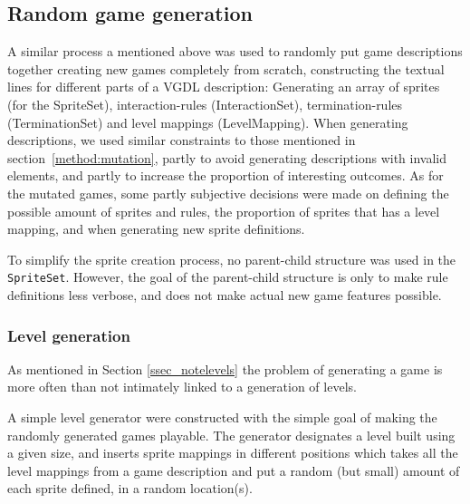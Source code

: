 \documentclass[a4paper,titlepage,final, twoside]{report}
\begin{document}
\subsection{Random game generation}
\label{method:random}
A similar process a mentioned above was used to randomly put game descriptions together creating new games completely from scratch, constructing the textual lines for different parts of a VGDL description: Generating an array of sprites (for the SpriteSet), interaction-rules (InteractionSet), termination-rules (TerminationSet) and level mappings (LevelMapping). 
When generating descriptions, we used similar constraints to those mentioned in section~\ref{method:mutation}, partly to avoid generating descriptions with invalid elements, and partly to increase the proportion of interesting outcomes. 
As for the mutated games, some partly subjective decisions were made on defining the possible amount of sprites and rules, the proportion of sprites that has a level mapping, and when generating new sprite definitions.

To simplify the sprite creation process, no parent-child structure was used in the \texttt{SpriteSet}.
However, the goal of the parent-child structure is only to make rule definitions less verbose, and does not make actual new game features possible.




\subsubsection*{Level generation}
As mentioned in Section \ref{ssec_notelevels} the problem of generating a game is more often than not intimately linked to a generation of levels.

A simple level generator were constructed with the simple goal of making the randomly generated games playable.
The generator designates a level built using a given size, and inserts sprite mappings in different positions
 which takes all the level mappings from a game description and put a random (but small) amount of each sprite defined, in a random location(s).



\end{document}
